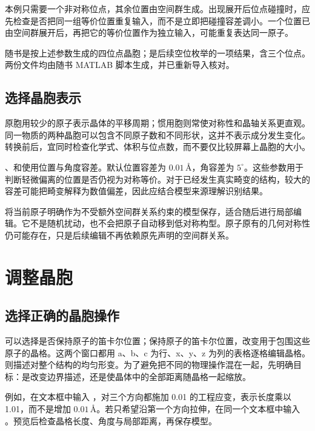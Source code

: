 
本例只需要一个非对称位点，其余位置由空间群生成。出现展开后位点碰撞时，应先检查是否把同一组等价位置重复输入，而不是立即把碰撞容差调小。一个位置已由空间群展开后，再把它的等价位置作为独立输入，可能重复表达同一原子。

随书是按上述参数生成的四位点晶胞；是后续空位枚举的一项结果，含三个位点。两份文件均由随书 MATLAB\regmark{} 脚本生成，并已重新导入核对。

\subsection{选择晶胞表示}

原胞用较少的原子表示晶体的平移周期；惯用胞则常使对称性和晶轴关系更直观。同一物质的两种晶胞可以包含不同原子数和不同形状，这并不表示成分发生变化。转换前后，宜同时检查化学式、体积与位点数，而不要仅比较屏幕上晶胞的大小。

、和使用位置与角度容差。默认位置容差为 $0.01\,\text{\AA}$，角容差为 $5^\circ$。这些参数用于判断轻微偏离的位置是否仍视为对称等价。对于已经发生真实畸变的结构，较大的容差可能把畸变解释为数值偏差，因此应结合模型来源理解识别结果。

将当前原子明确作为不受额外空间群关系约束的模型保存，适合随后进行局部编辑。它不是随机扰动，也不会把原子自动移到低对称构型。原子原有的几何对称性仍可能存在，只是后续编辑不再依赖原先声明的空间群关系。

\section{调整晶胞}

\subsection{选择正确的晶胞操作}

可以选择是否保持原子的笛卡尔位置；保持原子的笛卡尔位置，改变用于包围这些原子的晶格。这两个窗口都用 a、b、c 为行、x、y、z 为列的表格逐格编辑晶格。则描述对整个结构的均匀形变。为了避免把不同的物理操作混在一起，先明确目标：是改变边界描述，还是使晶体中的全部距离随晶格一起缩放。

例如，在文本框中输入 ，对三个方向都施加 0.01 的工程应变，表示长度乘以 1.01，而不是增加 $0.01\,\text{\AA}$。若只希望沿第一个方向拉伸，在同一个文本框中输入 。预览后检查晶格长度、角度与局部距离，再保存模型。

